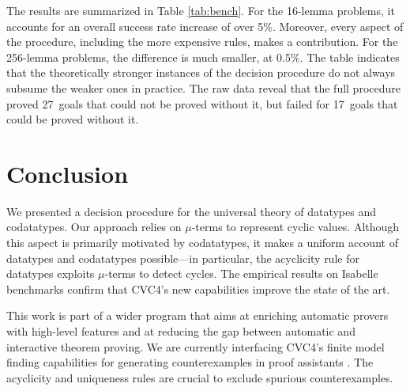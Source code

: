 \documentclass[letter]{article}
\theoremstyle{plain}
\theoremstyle{definition}
\begin{document}
The results are summarized in Table \ref{tab:bench}.
For the 16-lemma problems, it accounts for an overall
success rate increase of over 5\%.
Moreover, every aspect of the procedure, including the
more expensive rules, makes a contribution.
%
For the 256-lemma problems, the difference
is much smaller, at 0.5\%.
The table indicates that
the theoretically stronger instances of the decision
procedure do not always subsume the weaker ones in practice.
The raw data reveal that the full procedure proved 27~goals that
could not be proved without it, but failed for 17~goals that could be proved
without it.

\section{Conclusion}
\label{sec:conclusion}

We presented a decision procedure for the universal theory of datatypes and
codatatypes. Our approach relies on $\mu$-terms to represent cyclic values.
Although this aspect is primarily motivated by codatatypes, it makes
a uniform account of datatypes and codatatypes possible---in particular,
the acyclicity rule for datatypes exploits $\mu$-terms to detect cycles.
The empirical results on Isabelle benchmarks
confirm that CVC4's new capabilities improve the state of the art.

This work is part of a wider program that aims at enriching automatic provers
with high-level features and at reducing the gap between automatic and
interactive theorem proving.
We are currently interfacing CVC4's finite model finding capabilities
for generating counterexamples in proof assistants
\cite{reynolds-et-al-2015-smt}.
The acyclicity and uniqueness rules are
crucial to exclude spurious counterexamples.
\end{document}
